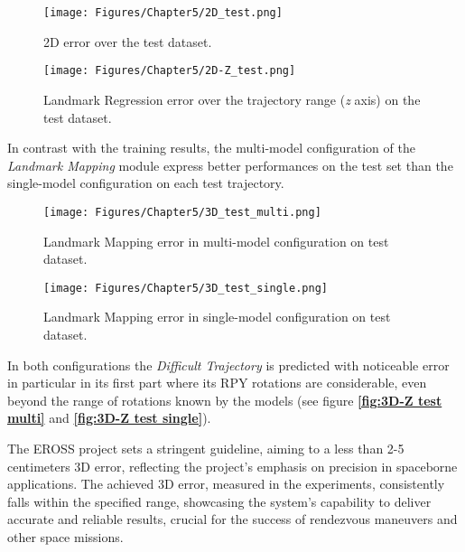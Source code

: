 \begin{figure}[H]
    \centering
    \texttt{[image: Figures/Chapter5/2D\_test.png]}
    \caption[2D error over the test dataset.]{2D error over the test dataset.}
    \label{fig:2D test}
\end{figure}

\begin{figure}[H]
    \centering
    \texttt{[image: Figures/Chapter5/2D-Z\_test.png]}
    \caption[Landmark Regression error on test dataset]{Landmark Regression error over the trajectory range (\textit{z} axis) on the test dataset.}
    \label{fig:2D-Z test}
\end{figure}

\newpage
In contrast with the training results, the multi-model configuration of the \textit{Landmark Mapping} module express better performances on the test set than the single-model configuration on each test trajectory.

\begin{figure}[H]
    \centering
    \texttt{[image: Figures/Chapter5/3D\_test\_multi.png]}
    \caption[Landmark Mapping error in multi-model configuration on test dataset.]{Landmark Mapping error in multi-model configuration on test dataset.}
    \label{fig:3D test multi}
\end{figure}

\begin{figure}[H]
    \centering
    \texttt{[image: Figures/Chapter5/3D\_test\_single.png]}
    \caption[Landmark Mapping error in single-model configuration on test dataset.]{Landmark Mapping error in single-model configuration on test dataset.}
    \label{fig:3D test single}
\end{figure}
\newpage
In both configurations the \textit{Difficult Trajectory} is predicted with noticeable error in particular in its first part where its RPY rotations are considerable, even beyond the range of rotations known by the models (see figure \textbf{\ref{fig:3D-Z test multi}} and \textbf{\ref{fig:3D-Z test single}}).

The EROSS project \cite{eross} sets a stringent guideline, aiming to a less than 2-5 centimeters 3D error, reflecting the project's emphasis on precision in spaceborne applications. The achieved 3D error, measured in the experiments, consistently falls within the specified range, showcasing the system's capability to deliver accurate and reliable results, crucial for the success of rendezvous maneuvers and other space missions.

